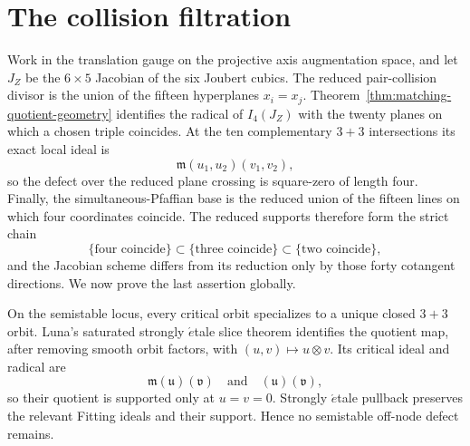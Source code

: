 \documentclass[11pt]{article}
\theoremstyle{definition}
\theoremstyle{remark}
\begin{document}
\appendix
\section{The collision filtration}
\label{app:collision-filtration}

Work in the translation gauge on the projective axis augmentation space,
and let \(J_Z\) be the \(6\times5\) Jacobian of the six Joubert cubics.
The reduced pair-collision divisor is the union of the fifteen hyperplanes
\(x_i=x_j\).  Theorem~\ref{thm:matching-quotient-geometry} identifies the
radical of \(I_4(J_Z)\) with the twenty planes on which a chosen triple
coincides.  At the ten complementary \(3+3\) intersections its exact local
ideal is
\[
 \mathfrak m(u_1,u_2)(v_1,v_2),
\]
so the defect over the reduced plane crossing is square-zero of length
four.  Finally, the simultaneous-Pfaffian base is the reduced union of the
fifteen lines on which four coordinates coincide.  The reduced supports
therefore form the strict chain
\[
 \{\text{four coincide}\}\subset
 \{\text{three coincide}\}\subset
 \{\text{two coincide}\},
\]
and the Jacobian scheme differs from its reduction only by those forty
cotangent directions.  We now prove the last assertion globally.

On the semistable locus, every critical orbit specializes to a unique closed
\(3+3\) orbit.  Luna's saturated strongly \(\acute{e}\)tale slice theorem
\cite[Section~III.1, pp.~95--100]{LunaSlices} identifies the quotient map,
after removing smooth orbit factors, with
\((u,v)\mapsto u\otimes v\).  Its critical ideal and radical are
\[
 \mathfrak m(\mathfrak u)(\mathfrak v)
 \quad\text{and}\quad
 (\mathfrak u)(\mathfrak v),
\]
so their quotient is supported only at \(u=v=0\).  Strongly \(\acute{e}\)tale
pullback preserves the relevant Fitting ideals and their support.  Hence no
semistable off-node defect remains.
\end{document}
